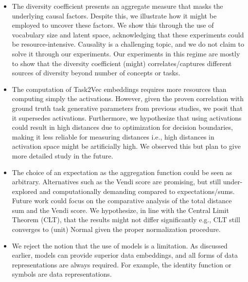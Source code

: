 \documentclass[10pt]{article} %
\begin{document}
\begin{itemize}
    \item The diversity coefficient presents an aggregate measure that masks the underlying causal factors. 
    Despite this, we illustrate how it might be employed to uncover these factors.
    We show this through the use of vocabulary size and latent space, acknowledging that these experiments could be resource-intensive.
    Causality is a challenging topic, and we do not claim to solve it through our experiments. 
    Our experiments in this regime are mostly to show that the diversity coefficient (might) correlates/captures different sources of diversity beyond number of concepts or tasks.
    \item The computation of Task2Vec embeddings requires more resources than computing simply the activations. 
    However, given the proven correlation with ground truth task generative parameters from previous studies, we posit that it supersedes activations. 
    Furthermore, we hypothesize that using activations could result in high distances due to optimization for decision boundaries, making it less reliable for measuring distances 
    i.e., high distances in activation space might be artificially high.
    We observed this but plan to give more detailed study in the future. 
    \item The choice of an expectation as the aggregation function could be seen as arbitrary. 
    Alternatives such as the Vendi score are promising, but still under-explored and computationally demanding compared to expectations/sums. 
    Future work could focus on the comparative analysis of the total distance sum and the Vendi score. 
    We hypothesize, in line with the Central Limit Theorem (CLT), that the results might not differ significantly e.g., CLT still converges to (unit) Normal given the proper normalization procedure. 
    \item We reject the notion that the use of models is a limitation. 
    As discussed earlier, models can provide superior data embeddings, and all forms of data representations are always required.
    For example, the identity function or symbols are data representations.
\end{itemize}
\end{document}
